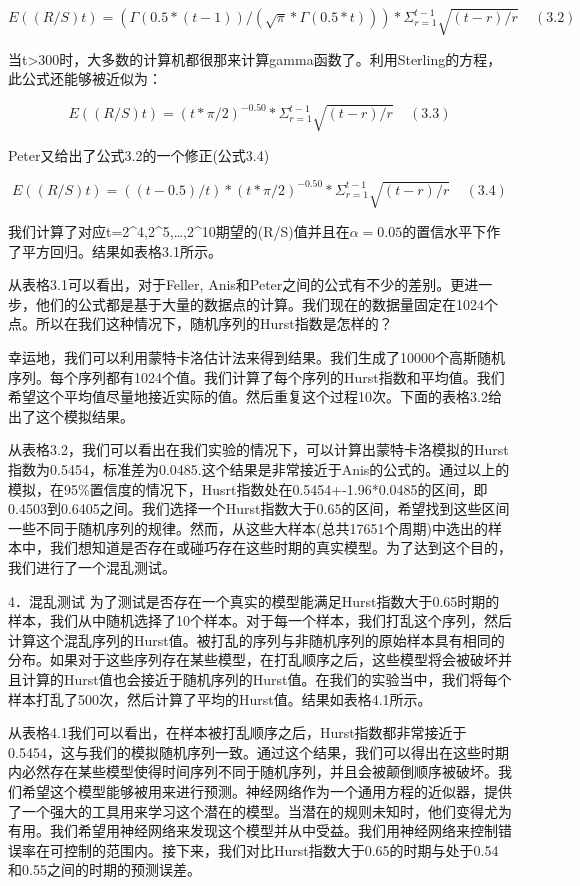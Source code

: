 \documentclass[12pt]{article}
\begin{document}
$$E((R/S)t)=(\Gamma(0.5*(t-1))/(\sqrt{\pi}*\Gamma(0.5*t)))*\Sigma_{r=1}^{t-1}\sqrt{(t-r)/r}                               ~~~~~(3.2)$$

当t>300时，大多数的计算机都很那来计算gamma函数了。利用Sterling的方程，此公式还能够被近似为：

$$E((R/S)t)=(t*\pi/2)^{-0.50}*\Sigma_{r=1}^{t-1}\sqrt{(t-r)/r}     ~~~~~(3.3)$$

Peter又给出了公式3.2的一个修正(公式3.4)

$$E((R/S)t)=((t-0.5)/t)*(t*\pi/2)^{-0.50}*\Sigma_{r=1}^{t-1}\sqrt{(t-r)/r}          ~~~~~ (3.4)$$

我们计算了对应t=2^4,2^5,…,2^10期望的(R/S)值并且在$\alpha=0.05$的置信水平下作了平方回归。结果如表格3.1所示。

从表格3.1可以看出，对于Feller, Anis和Peter之间的公式有不少的差别。更进一步，他们的公式都是基于大量的数据点的计算。我们现在的数据量固定在1024个点。所以在我们这种情况下，随机序列的Hurst指数是怎样的？

幸运地，我们可以利用蒙特卡洛估计法来得到结果。我们生成了10000个高斯随机序列。每个序列都有1024个值。我们计算了每个序列的Hurst指数和平均值。我们希望这个平均值尽量地接近实际的值。然后重复这个过程10次。下面的表格3.2给出了这个模拟结果。

从表格3.2，我们可以看出在我们实验的情况下，可以计算出蒙特卡洛模拟的Hurst指数为0.5454，标准差为0.0485.这个结果是非常接近于Anis的公式的。通过以上的模拟，在95\%置信度的情况下，Husrt指数处在0.5454+-1.96*0.0485的区间，即0.4503到0.6405之间。我们选择一个Hurst指数大于0.65的区间，希望找到这些区间一些不同于随机序列的规律。然而，从这些大样本(总共17651个周期)中选出的样本中，我们想知道是否存在或碰巧存在这些时期的真实模型。为了达到这个目的，我们进行了一个混乱测试。

4．混乱测试
为了测试是否存在一个真实的模型能满足Hurst指数大于0.65时期的样本，我们从中随机选择了10个样本。对于每一个样本，我们打乱这个序列，然后计算这个混乱序列的Hurst值。被打乱的序列与非随机序列的原始样本具有相同的分布。如果对于这些序列存在某些模型，在打乱顺序之后，这些模型将会被破坏并且计算的Hurst值也会接近于随机序列的Hurst值。在我们的实验当中，我们将每个样本打乱了500次，然后计算了平均的Hurst值。结果如表格4.1所示。

从表格4.1我们可以看出，在样本被打乱顺序之后，Hurst指数都非常接近于0.5454，这与我们的模拟随机序列一致。通过这个结果，我们可以得出在这些时期内必然存在某些模型使得时间序列不同于随机序列，并且会被颠倒顺序被破坏。我们希望这个模型能够被用来进行预测。神经网络作为一个通用方程的近似器，提供了一个强大的工具用来学习这个潜在的模型。当潜在的规则未知时，他们变得尤为有用。我们希望用神经网络来发现这个模型并从中受益。我们用神经网络来控制错误率在可控制的范围内。接下来，我们对比Hurst指数大于0.65的时期与处于0.54和0.55之间的时期的预测误差。
\end{document}
